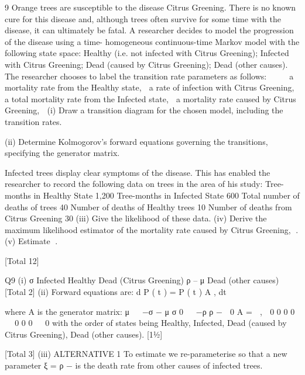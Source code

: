 \documentclass[a4paper,12pt]{article}
\begin{document}


9
Orange trees are susceptible to the disease Citrus Greening. There is no known cure
for this disease and, although trees often survive for some time with the disease, it can
ultimately be fatal.
A researcher decides to model the progression of the disease using a time-
homogeneous continuous-time Markov model with the following state space:
{Healthy (i.e. not infected with Citrus Greening);
Infected with Citrus Greening;
Dead (caused by Citrus Greening);
Dead (other causes)}.
The researcher chooses to label the transition rate parameters as follows:




a mortality rate from the Healthy state, 
a rate of infection with Citrus Greening, 
a total mortality rate from the Infected state, 
a mortality rate caused by Citrus Greening, 
(i) Draw a transition diagram for the chosen model, including the transition rates.

(ii) Determine Kolmogorov’s forward equations governing the transitions,
specifying the generator matrix.

Infected trees display clear symptoms of the disease. This has enabled the researcher
to record the following data on trees in the area of his study:
Tree-months in Healthy State
1,200
Tree-months in Infected State
600
Total number of deaths of trees
40
Number of deaths of Healthy trees
10
Number of deaths from Citrus Greening
30
(iii) Give the likelihood of these data. 
(iv) Derive the maximum likelihood estimator of the mortality rate caused by
Citrus Greening, . 
(v)
Estimate .

[Total 12]


Q9
(i)
σ
Infected
Healthy
\tau
Dead
(Citrus
Greening)
ρ – \tau
μ
Dead
(other
causes)
[Total 2]
(ii)
Forward equations are:
d
P ( t ) = P ( t ) A ,
dt

where A is the generator matrix:
μ 
 −σ − μ σ 0


−ρ \tau ρ − \tau 
0
A = 
,
 0
0 0
0 


0 0
0 
 0
with the order of states being
{Healthy, Infected, Dead (caused by Citrus Greening),
Dead (other causes)}.
[11⁄2]

[Total 3]%
(iii)
ALTERNATIVE 1
To estimate \tau we re-parameterise so that a new parameter ξ = ρ − \tau is the death
rate from other causes of infected trees.
\end{document}
